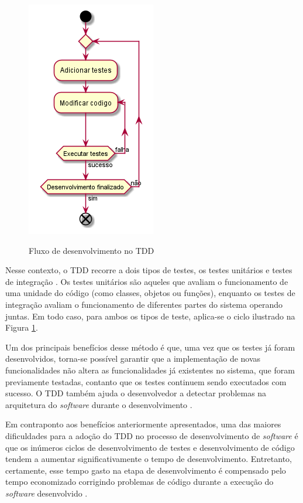 \begin{figure}[!htb]
  \centering
  \caption{Fluxo de desenvolvimento no TDD}
  \includegraphics[width=.33\textwidth]{../out/diagrams/tdd/tdd.png}
  \smallskip
  \label{fig:tdd_flow}
\end{figure}

Nesse contexto, o TDD recorre a dois tipos de testes, os testes unitários e
testes de integração \cite{ambler_2006}. Os testes unitários são aqueles que
avaliam o funcionamento de uma unidade do código (como classes, objetos ou
funções), enquanto os testes de integração avaliam o funcionamento de diferentes
partes do sistema operando juntas. Em todo caso, para ambos os tipos de teste,
aplica-se o ciclo ilustrado na Figura \ref{fig:tdd_flow}.

Um dos principais benefícios desse método é que, uma vez que os testes já foram
desenvolvidos, torna-se possível garantir que a implementação de novas
funcionalidades não altera as funcionalidades já existentes no sistema, que
foram previamente testadas, contanto que os testes continuem sendo executados
com sucesso. O TDD também ajuda o desenvolvedor a detectar problemas na
arquitetura do \textit{software} durante o desenvolvimento
\cite{test_driven_2013}.

Em contraponto aos benefícios anteriormente apresentados, uma das maiores
dificuldades para a adoção do TDD no processo de desenvolvimento de
\textit{software} é que os inúmeros ciclos de desenvolvimento de testes e
desenvolvimento de código tendem a aumentar significativamente o tempo de
desenvolvimento. Entretanto, certamente, esse tempo gasto na etapa de
desenvolvimento é compensado pelo tempo economizado corrigindo problemas de
código durante a execução do \textit{software} desenvolvido
\cite{test_driven_2013}.

